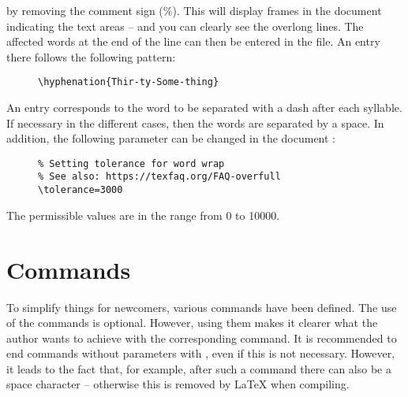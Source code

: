 by removing the comment sign (\%). This will display frames in the document
indicating the text areas -- and you can clearly see the overlong lines. The
affected words at the end of the line can then be entered in the
 file. An entry there follows the following
pattern:

\begin{figure}[H]
    \small
    \centering
    \begin{BVerbatim}
\hyphenation{Thir-ty-Some-thing}
    \end{BVerbatim}
\end{figure}

An entry corresponds to the word to be separated with a dash after each
syllable. If necessary in the different cases, then the words are separated
by a space. In addition, the following parameter can be changed in the document
:

\begin{figure}[H]
    \small
    \centering
    \begin{BVerbatim}
\tolerance=3000
    \end{BVerbatim}
\end{figure}

The permissible values are in the range from 0 to 10000.

\section{Commands}
\label{sec:Commands}

To simplify things for newcomers, various commands have been defined. The use
of the commands is optional. However, using them makes it clearer what the
author wants to achieve with the corresponding command. It is recommended to
end commands without parameters with \tsTextMonospace{\{\}}, even if this is
not necessary. However, it leads to the fact that, for example, after such a
command there can also be a space character -- otherwise this is removed by
\LaTeX{} when compiling.

